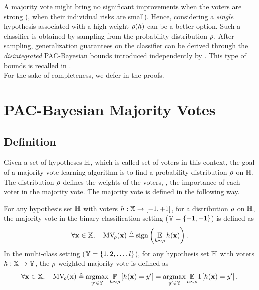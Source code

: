 A majority vote might bring no significant improvements when the voters are strong (\ie, when their individual risks are small). 
Hence, considering a {\it single} hypothesis associated with a high weight $\rho(h)$ can be a better option.
Such a classifier is obtained by sampling from the probability distribution $\rho$.
After sampling, generalization guarantees on the classifier can be derived through the {\it disintegrated} PAC-Bayesian bounds introduced independently by \citet{Catoni2007,BlanchardFleuret2007}.
This type of bounds is recalled in .\\

For the sake of completeness, we defer in  the proofs.

\section{PAC-Bayesian Majority Votes}

\subsection{Definition}

Given a set of hypotheses $\mathbb{H}$, which is called set of voters in this context, the goal of a majority vote learning algorithm is to find a probability distribution $\rho$ on $\mathbb{H}$.
The distribution $\rho$ defines the weights of the voters, \ie, the importance of each voter in the majority vote.
The majority vote is defined in the following way.

\begin{definition}
For any hypothesis set $\mathbb{H}$ with voters $h:\mathbb{X}\to[-1,+1]$, for a distribution $\rho$ on $\mathbb{H}$, the majority vote in the binary classification setting ($\mathbb{Y}=\{-1,+1\}$) is defined as
\begin{align*}
\forall \mathbf{x}\in\mathbb{X},\quad  \text{MV}_{\!\rho}(\mathbf{x}) \triangleq \operatorname{sign}\left( \operatorname*{\mathbb{E}}_{h\sim\rho} h(\mathbf{x})\right).
\end{align*}
In the multi-class setting ($\mathbb{Y}=\{1, 2, \dots, l\}$), for any hypothesis set $\mathbb{H}$ with voters $h:\mathbb{X}\to \mathbb{Y}$, the $\rho$-weighted majority vote is defined as
\begin{align*}
\forall \mathbf{x}\in\mathbb{X},\quad  \text{MV}_{\!\rho}(\mathbf{x}) \triangleq \operatorname*{\text{\rm argmax}}_{y'\in\mathbb{Y}} \operatorname*{\mathbb{P}}_{h\sim\rho}\left[ h(\mathbf{x}) = y'\right] = \operatorname*{\text{\rm argmax}}_{y'\in\mathbb{Y}}\operatorname*{\mathbb{E}}_{h\sim\rho}\operatorname{I}\left[ h(\mathbf{x}) = y'\right].
\end{align*}
\label{chap:pac-bayes:majority-vote}
\end{definition}

